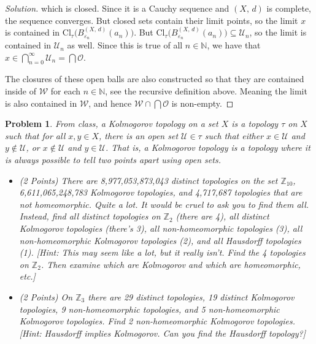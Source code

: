 \documentclass{article}
\theoremstyle{normal}
\newtheorem{problem}{Problem}
\begin{document}
\begin{proof}[Solution]
        which is closed. Since it is a Cauchy sequence and $(X,\,d)$ is
        complete, the sequence converges. But closed sets contain their limit
        points, so the limit $x$ is contained in
        $\textrm{Cl}_{\tau}\big(B_{\varepsilon_{n}}^{(X,\,d)}(a_{n})\big)$. But
        $\textrm{Cl}_{\tau}\big(B_{\varepsilon_{n}}^{(X,\,d)}(a_{n})\big)\subseteq\mathcal{U}_{n}$,
        so the limit is contained in $\mathcal{U}_{n}$ as well. Since this is
        true of all $n\in\mathbb{N}$, we have that
        $x\in\bigcap_{n=0}^{\infty}\mathcal{U}_{n}=\bigcap\mathcal{O}$.
        \par\hfill\par
        The closures of these open balls are also constructed so that they are
        contained inside of $\mathcal{W}$ for each $n\in\mathbb{N}$, see the
        recursive definition above. Meaning the limit is also contained in
        $\mathcal{W}$, and hence
        $\mathcal{W}\cap\bigcap\mathcal{O}$ is non-empty.
    \end{proof}
    \clearpage
    \color{blue}
    \begin{problem}
        From class, a Kolmogorov topology on a set $X$ is a topology
        $\tau$ on $X$ such that for all $x,y\in{X}$, there is an open set
        $\mathcal{U}\in\tau$ such that either $x\in\mathcal{U}$ and
        $y\notin\mathcal{U}$, or $x\notin\mathcal{U}$ and $y\in\mathcal{U}$.
        That is, a Kolmogorov topology is a topology where it is always possible
        to tell two points apart using open sets.
        \begin{itemize}
            \item (2 Points)
                There are 8,977,053,873,043 distinct topologies on the set
                $\mathbb{Z}_{10}$, 6,611,065,248,783 Kolmogorov topologies,
                and 4,717,687 topologies that are not homeomorphic. Quite a lot.
                It would be cruel to ask you to find them all. Instead, find all
                distinct topologies on $\mathbb{Z}_{2}$ (there are 4), all
                distinct Kolmogorov topologies (there's 3), all non-homeomorphic
                topologies (3), all non-homeomorphic Kolmogorov topologies
                (2), and all Hausdorff topologies (1). [Hint: This may seem
                like a lot, but it really isn't. Find the 4 topologies on
                $\mathbb{Z}_{2}$. Then examine which are Kolmogorov and which
                are homeomorphic, etc.]
            \item (2 Points)
                On $\mathbb{Z}_{3}$ there are 29 distinct topologies, 19
                distinct Kolmogorov topologies, 9 non-homeomorphic topologies,
                and 5 non-homeomorphic Kolmogorov topologies. Find 2
                non-homeomorphic Kolmogorov topologies.
                [Hint: Hausdorff implies Kolmogorov. Can you find the
                Hausdorff topology?]
        \end{itemize}
    \end{problem}
\end{document}
